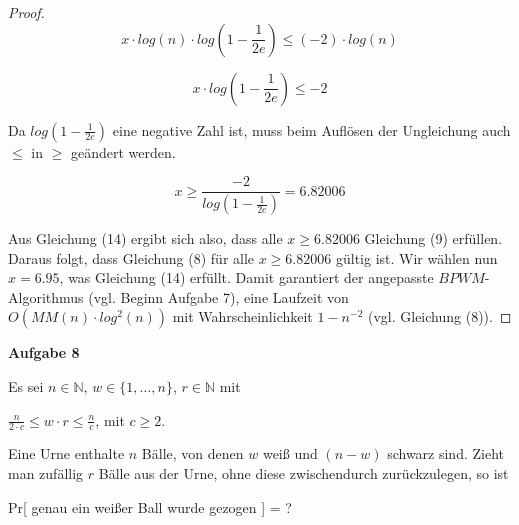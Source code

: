 \documentclass{article}
\begin{document}
\begin{proof}
  \begin{equation}
    x \cdot log \left( n \right) \cdot log \left( 1 - \frac{1}{2e} \right) \leq (-2) \cdot log \left( n \right)
  \end{equation}

  \begin{equation}
    x \cdot log \left( 1 - \frac{1}{2e} \right) \leq -2
  \end{equation}

  Da $log \left( 1 - \frac{1}{2e} \right)$ eine negative Zahl ist, muss beim
  Aufl{\"o}sen der Ungleichung auch $\leq$ in $\geq$ ge{\"a}ndert werden.

  \begin{equation}
    x \geq \frac{-2}{log \left( 1 - \frac{1}{2e} \right)} = 6.82006
  \end{equation}

  Aus Gleichung (14) ergibt sich also, dass alle $x \geq 6.82006$ Gleichung (9)
  erf{\"u}llen. \newline
  Daraus folgt, dass Gleichung (8) f{\"u}r alle $x \geq 6.82006$ g{\"u}ltig ist.
  \newline
  Wir w{\"a}hlen nun $x = 6.95$, was Gleichung (14) erf{\"u}llt. \newline
  Damit garantiert der angepasste $BPWM$-Algorithmus (vgl. Beginn Aufgabe 7),
  eine Laufzeit von $O \left( MM \left( n \right) \cdot log^2(n) \right)$ mit
  Wahrscheinlichkeit $1 - n^{-2}$  (vgl. Gleichung (8)).
\end{proof}

\newpage
{\noindent\bfseries Aufgabe 8}%
\medskip%

\noindent
Es sei $n \in \mathbb{N}$, $w \in \{ 1, \ldots, n \}$, $r \in \mathbb{N}$ mit
\begin{center}
  $\frac{n}{2 \cdot c} \leq w \cdot r \leq \frac{n}{c}$, mit $c \geq 2$.
\end{center}
Eine Urne enthalte $n$ B{\"a}lle, von denen $w$ wei{\ss} und $(n - w)$ schwarz sind.
Zieht man zuf{\"a}llig $r$ B{\"a}lle aus der Urne, ohne diese zwischendurch
zur{\"u}ckzulegen, so ist
\begin{center}
  Pr[ genau ein wei{\ss}er Ball wurde gezogen ] = ?
\end{center}
\end{document}
